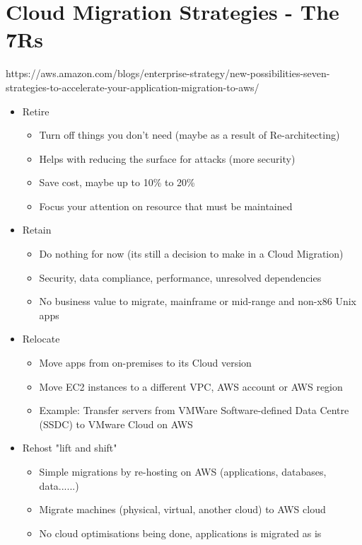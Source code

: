\section{Cloud Migration Strategies - The 7Rs}
https://aws.amazon.com/blogs/enterprise-strategy/new-possibilities-seven-strategies-to-accelerate-your-application-migration-to-aws/

\begin{itemize}
    \item Retire
    \begin{itemize}
        \item Turn off things you don't need (maybe as a result of Re-architecting)
        \item Helps with reducing the surface for attacks (more security)
        \item Save cost, maybe up to 10\% to 20\%
        \item Focus your attention on resource that must be maintained
    \end{itemize}
    \item Retain
    \begin{itemize}
        \item Do nothing for now (its still a decision to make in a Cloud Migration)
        \item Security, data compliance, performance, unresolved dependencies
        \item No business value to migrate, mainframe or mid-range and non-x86 Unix apps
    \end{itemize}
    \item Relocate
    \begin{itemize}
        \item Move apps from on-premises to its Cloud version
        \item Move EC2 instances to a different VPC, AWS account or AWS region
        \item Example: Transfer servers from VMWare Software-defined Data Centre (SSDC) to VMware Cloud on AWS
    \end{itemize}
    \item Rehost "lift and shift"
    \begin{itemize}
        \item Simple migrations by re-hosting on AWS (applications, databases, data......)
        \item Migrate machines (physical, virtual, another cloud) to AWS cloud
        \item No cloud optimisations being done, applications is migrated as is

\end{itemize}
\end{itemize}
